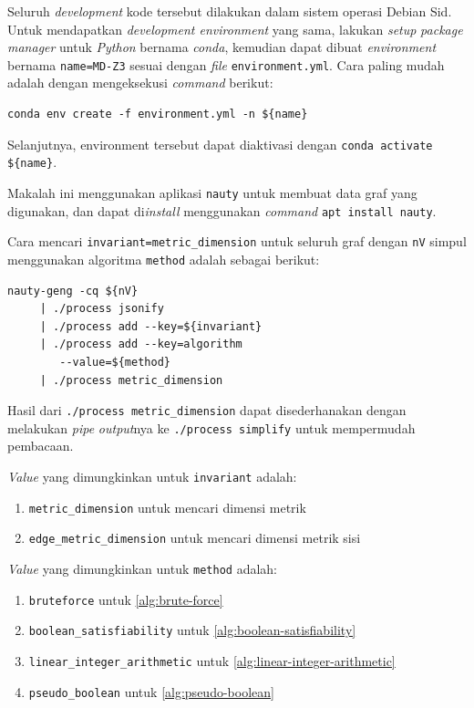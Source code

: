 \documentclass[10pt,twocolumn]{article}
\newcommand{\foreign}[1]{\foreignlanguage{english}{\textit{#1}}}
\begin{document}
Seluruh \foreign{development} kode tersebut dilakukan dalam sistem operasi Debian Sid. Untuk mendapatkan \foreign{development environment} yang sama, lakukan \foreign{setup} \foreign{package manager} untuk \foreign{Python} bernama \foreign{conda}, kemudian dapat dibuat \foreign{environment} bernama \verb`name=MD-Z3` sesuai dengan \foreign{file} \linebreak \verb`environment.yml`. Cara paling mudah adalah dengan mengeksekusi \foreign{command} berikut:
\vspace{-.375\baselineskip}
\begin{Verbatim}[gobble=1, xleftmargin=1em]
	conda env create -f environment.yml -n ${name}
\end{Verbatim}
\vspace{-.375\baselineskip}
Selanjutnya, environment tersebut dapat diaktivasi dengan \verb`conda activate ${name}`.

Makalah ini menggunakan aplikasi \verb`nauty` untuk membuat data graf yang digunakan, dan dapat di\foreign{install} menggunakan \foreign{command} \verb`apt install nauty`.

Cara mencari \verb`invariant=metric_dimension` untuk seluruh graf dengan \verb`nV` simpul menggunakan algoritma \verb`method` adalah sebagai berikut:
\vspace{-.375\baselineskip}
\begin{Verbatim}[gobble=1, xleftmargin=1em]
	nauty-geng -cq ${nV}
	 | ./process jsonify
	 | ./process add --key=${invariant}
	 | ./process add --key=algorithm
		--value=${method}
	 | ./process metric_dimension
\end{Verbatim}
\vspace{-.375\baselineskip}
Hasil dari \verb`./process metric_dimension` dapat disederhanakan dengan melakukan \foreign{pipe} \foreign{output}nya ke \verb`./process simplify` untuk mempermudah pembacaan.

\noindent \foreign{Value} yang dimungkinkan untuk \verb`invariant` adalah:
\begin{enumerate}
	\item \verb`metric_dimension` untuk mencari dimensi metrik
	\item \verb`edge_metric_dimension` untuk mencari dimensi metrik sisi
\end{enumerate}

\noindent \foreign{Value} yang dimungkinkan untuk \verb`method` adalah:
\begin{enumerate}
	\item \verb`bruteforce` untuk \autoref{alg:brute-force}
	\item \verb`boolean_satisfiability` untuk \autoref{alg:boolean-satisfiability}
	\item \verb`linear_integer_arithmetic` untuk \autoref{alg:linear-integer-arithmetic}
	\item \verb`pseudo_boolean` untuk \autoref{alg:pseudo-boolean}
\end{enumerate}
\end{document}
